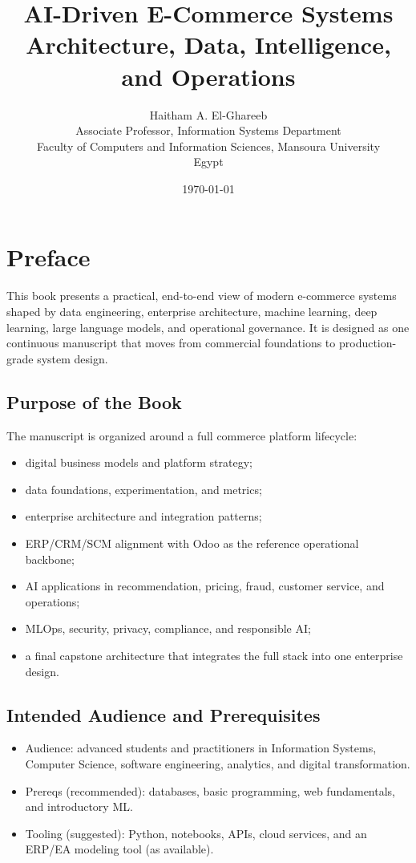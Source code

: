 \documentclass[11pt]{book}
\title{AI-Driven E-Commerce Systems\\Architecture, Data, Intelligence, and Operations}
\author{Haitham A. El-Ghareeb\\Associate Professor, Information Systems Department\\Faculty of Computers and Information Sciences, Mansoura University\\Egypt}
\date{\today}
\begin{document}
\frontmatter
\maketitle
\tableofcontents

\chapter*{Preface}
This book presents a practical, end-to-end view of modern e-commerce systems shaped by data engineering, enterprise architecture, machine learning, deep learning, large language models, and operational governance.
It is designed as one continuous manuscript that moves from commercial foundations to production-grade system design.

\section*{Purpose of the Book}
The manuscript is organized around a full commerce platform lifecycle:
\begin{itemize}
  \item digital business models and platform strategy;
  \item data foundations, experimentation, and metrics;
  \item enterprise architecture and integration patterns;
  \item ERP/CRM/SCM alignment with Odoo as the reference operational backbone;
  \item AI applications in recommendation, pricing, fraud, customer service, and operations;
  \item MLOps, security, privacy, compliance, and responsible AI;
  \item a final capstone architecture that integrates the full stack into one enterprise design.
\end{itemize}

\section*{Intended Audience and Prerequisites}
\begin{itemize}
  \item Audience: advanced students and practitioners in Information Systems, Computer Science, software engineering, analytics, and digital transformation.
  \item Prereqs (recommended): databases, basic programming, web fundamentals, and introductory ML.
  \item Tooling (suggested): Python, notebooks, APIs, cloud services, and an ERP/EA modeling tool (as available).
\end{itemize}
\end{document}
